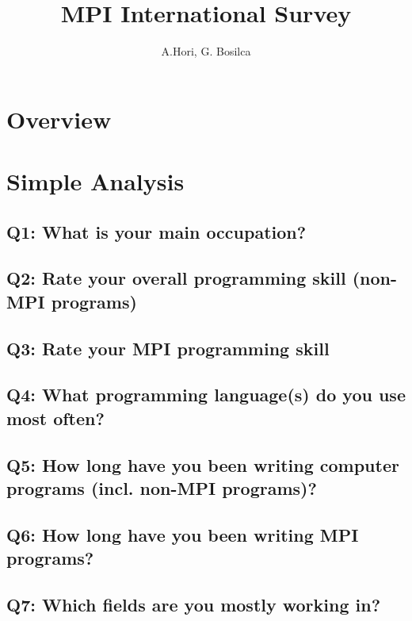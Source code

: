 \documentclass{report}
\title{MPI International Survey}
\author{A.Hori, G. Bosilca}
\begin{document}
\maketitle

\todototoc
\listoftodos

\tableofcontents
\newpage

\chapter{Overview}


\chapter{Simple Analysis}
\section{Q1: What is your main occupation?}


\clearpage
\section{Q2: Rate your overall programming skill (non-MPI programs)}


\clearpage
\section{Q3: Rate your MPI programming skill}


\clearpage
\section{Q4: What programming language(s) do you use most often?}


\clearpage
\section{Q5: How long have you been writing computer programs (incl. non-MPI programs)?}


\clearpage
\section{Q6: How long have you been writing MPI programs?}


\clearpage
\section{Q7: Which fields are you mostly working in?}

\end{document}
